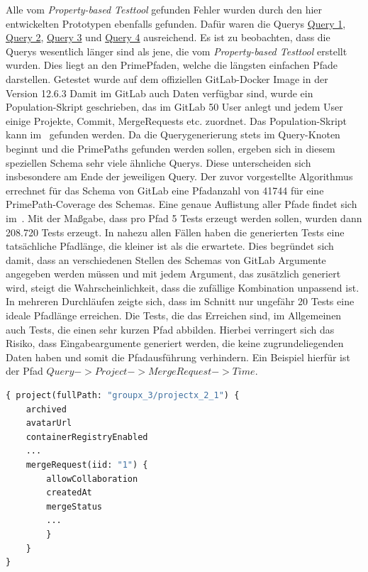 Alle vom \textit{Property-based Testtool} gefunden Fehler wurden durch den hier entwickelten Prototypen ebenfalls gefunden.
Dafür waren die Querys \hyperref[query1]{Query 1}, \hyperref[query2]{Query 2}, \hyperref[query3]{Query 3} und \hyperref[query4]{Query 4} ausreichend.
Es ist zu beobachten, dass die Querys wesentlich länger sind als jene, die vom \textit{Property-based Testtool} erstellt wurden.
Dies liegt an den PrimePfaden, welche die längsten einfachen Pfade darstellen.
Getestet wurde auf dem offiziellen GitLab-Docker Image in der Version 12.6.3
Damit im GitLab auch Daten verfügbar sind, wurde ein Population-Skript geschrieben, das im GitLab
50 User anlegt und jedem User einige Projekte, Commit, MergeRequests etc. zuordnet.
Das Population-Skript kann im~\cite[Github]{populationscript} gefunden werden.
Da die Querygenerierung stets im Query-Knoten beginnt und die PrimePaths gefunden werden sollen, ergeben sich in diesem speziellen Schema sehr viele ähnliche Querys.
Diese unterscheiden sich insbesondere am Ende der jeweiligen Query.
Der zuvor vorgestellte Algorithmus errechnet für das Schema von GitLab eine Pfadanzahl von 41744 für eine PrimePath-Coverage des Schemas.
Eine genaue Auflistung aller Pfade findet sich im~\cite[GitHub]{gitlabpaths}.
Mit der Maßgabe, dass pro Pfad 5 Tests erzeugt werden sollen, wurden dann 208.720 Tests erzeugt.
In nahezu allen Fällen haben die generierten Tests eine tatsächliche Pfadlänge, die kleiner ist als die erwartete.
Dies begründet sich damit, dass an verschiedenen Stellen des Schemas von GitLab Argumente angegeben werden müssen
und mit jedem Argument, das zusätzlich generiert wird, steigt die Wahrscheinlichkeit, dass die zufällige Kombination unpassend ist.
In mehreren Durchläufen zeigte sich, dass im Schnitt nur ungefähr 20 Tests eine ideale Pfadlänge erreichen.
Die Tests, die das Erreichen sind, im Allgemeinen auch Tests, die einen sehr kurzen Pfad abbilden.
Hierbei verringert sich das Risiko, dass Eingabeargumente generiert werden, die keine zugrundeliegenden Daten haben und somit die Pfadausführung verhindern.
Ein Beispiel hierfür ist der Pfad $Query -> Project -> MergeRequest -> Time$.

\begin{lstlisting}[language=GraphQL]
{ project(fullPath: "groupx_3/projectx_2_1") {
    archived
    avatarUrl
    containerRegistryEnabled
    ...
    mergeRequest(iid: "1") {
        allowCollaboration
        createdAt
        mergeStatus
        ...
        }
    }
}
\end{lstlisting}

